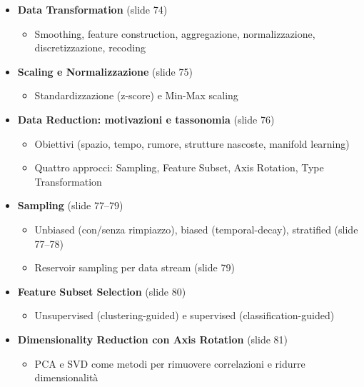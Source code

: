 \documentclass[11pt]{article}
\theoremstyle{smallexample}
\begin{document}
\begin{itemize}
  \item \textbf{Data Transformation} (slide 74)
    \begin{itemize}
      \item Smoothing, feature construction, aggregazione, normalizzazione,
            discretizzazione, recoding
    \end{itemize}

  \item \textbf{Scaling e Normalizzazione} (slide 75)
    \begin{itemize}
      \item Standardizzazione (z-score) e Min-Max scaling
    \end{itemize}

  \item \textbf{Data Reduction: motivazioni e tassonomia} (slide 76)
    \begin{itemize}
      \item Obiettivi (spazio, tempo, rumore, strutture nascoste, manifold learning)
      \item Quattro approcci: Sampling, Feature Subset, Axis Rotation, Type Transformation
    \end{itemize}

  \item \textbf{Sampling} (slide 77--79)
    \begin{itemize}
      \item Unbiased (con/senza rimpiazzo), biased (temporal-decay), stratified (slide 77--78)
      \item Reservoir sampling per data stream (slide 79)
    \end{itemize}

  \item \textbf{Feature Subset Selection} (slide 80)
    \begin{itemize}
      \item Unsupervised (clustering-guided) e supervised (classification-guided)
    \end{itemize}

  \item \textbf{Dimensionality Reduction con Axis Rotation} (slide 81)
    \begin{itemize}
      \item PCA e SVD come metodi per rimuovere correlazioni e ridurre dimensionalità
    \end{itemize}
\end{itemize}

\pagebreak
\end{document}
